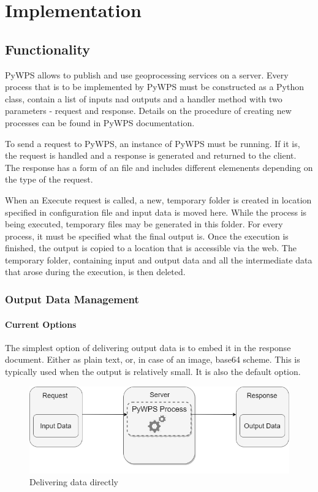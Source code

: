 \chapter{Implementation}
\label{4-practical}

\section{Functionality} 

PyWPS allows to publish and use geoprocessing services on a server. Every process that is to be implemented by PyWPS must be constructed as a Python class, contain a list of inputs nad outputs and a handler method with two parameters - request and response. \cite{pywpsprocess} Details on the procedure of creating new processes can be found in PyWPS documentation.

To send a request to PyWPS, an instance of PyWPS must be running. If it is, the request is handled and a response is generated and returned to the client. The response has a form of an  file and includes different elemenents depending on the type of the request.

When an Execute request is called, a new, temporary folder is created in location specified in configuration file and input data is moved here. While the process is being executed, temporary files may be generated in this folder. For every process, it must be specified what the final output is. Once the execution is finished, the output is copied to a location that is accessible via the web. The temporary folder, containing input and output data and all the intermediate data that arose during the execution, is then deleted.

\subsection{Output Data Management}

\subsubsection{Current Options} 

The simplest option of delivering output data is to embed it in the  response document. Either as plain text,  or, in case of an image, base64 scheme. This is typically used when the output is relatively small. It is also the default option.

\begin{figure}[H] \centering
      \includegraphics[width=350pt]{./pictures/optionone.png}
      \caption[Delivering data directly]{Delivering data directly}
      \label{fig:optionone}
  \end{figure}

